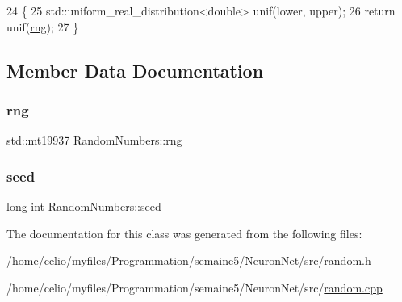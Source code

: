 \begin{DoxyCode}
24 \{
25     std::uniform\_real\_distribution<double> unif(lower, upper);
26     \textcolor{keywordflow}{return} unif(\hyperlink{classRandomNumbers_a15ceee85d6d00de12ae76c90aaec2f14}{rng});
27 \}
\end{DoxyCode}


\subsection{Member Data Documentation}
\mbox{\label{classRandomNumbers_a15ceee85d6d00de12ae76c90aaec2f14}} 
\subsubsection{\texorpdfstring{rng}{rng}}
{\footnotesize\ttfamily std\+::mt19937 Random\+Numbers\+::rng\hspace{0.3cm}{\ttfamily [private]}}

\mbox{\label{classRandomNumbers_a83c563bc5ca60f2e5c149244b327d948}} 
\subsubsection{\texorpdfstring{seed}{seed}}
{\footnotesize\ttfamily long int Random\+Numbers\+::seed\hspace{0.3cm}{\ttfamily [private]}}



The documentation for this class was generated from the following files\+:\begin{DoxyCompactItemize}
\item 
/home/celio/myfiles/\+Programmation/semaine5/\+Neuron\+Net/src/\hyperlink{random_8h}{random.\+h}\item 
/home/celio/myfiles/\+Programmation/semaine5/\+Neuron\+Net/src/\hyperlink{random_8cpp}{random.\+cpp}\end{DoxyCompactItemize}
